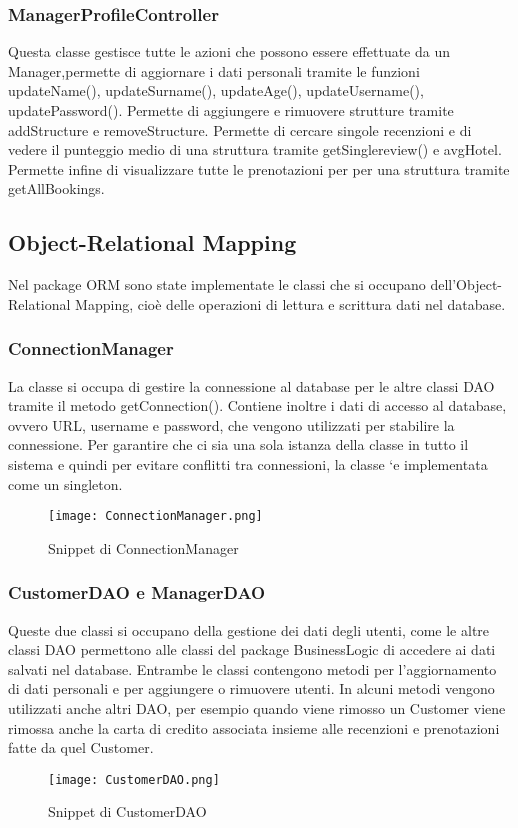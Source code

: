 \documentclass{article}
\begin{document}
\subsubsection{ManagerProfileController}
Questa classe gestisce tutte le azioni che possono essere effettuate da un Manager,permette di aggiornare i dati personali tramite le funzioni updateName(), updateSurname(), updateAge(), updateUsername(), updatePassword(). Permette di aggiungere e rimuovere strutture tramite addStructure e removeStructure. Permette di cercare singole recenzioni e di vedere il punteggio medio di una struttura tramite getSinglereview() e avgHotel. Permette infine di visualizzare tutte le prenotazioni per per una struttura tramite getAllBookings.
\subsection{Object-Relational Mapping}
Nel package ORM sono state implementate le classi che si occupano dell'Object-Relational Mapping, cioè delle operazioni di lettura e scrittura dati nel database.
\subsubsection{ConnectionManager}
La classe si occupa di gestire la connessione al database per le altre classi DAO tramite
il metodo getConnection(). Contiene inoltre i dati di accesso al database, ovvero URL,
username e password, che vengono utilizzati per stabilire la connessione. Per garantire
che ci sia una sola istanza della classe in tutto il sistema e quindi per evitare conflitti tra
connessioni, la classe `e implementata come un singleton.
\begin{figure}[h!]
    \centering
    \texttt{[image: ConnectionManager.png]}
    \caption{Snippet di ConnectionManager}
    \label{fig:ConnectionManager}
\end{figure}
\subsubsection{CustomerDAO e ManagerDAO}
Queste due classi si occupano della gestione dei dati degli utenti, come le altre classi DAO permettono alle classi del package BusinessLogic di accedere ai dati salvati nel database. Entrambe le classi contengono metodi per l'aggiornamento di dati personali e per aggiungere o rimuovere utenti. In alcuni metodi vengono utilizzati anche altri DAO, per esempio quando viene rimosso un Customer viene rimossa anche la carta di credito associata insieme alle recenzioni e prenotazioni fatte da quel Customer.
\begin{figure}[h!]
    \centering
    \texttt{[image: CustomerDAO.png]}
    \caption{Snippet di CustomerDAO}
    \label{fig:CustomerDAO}
\end{figure}
\end{document}
